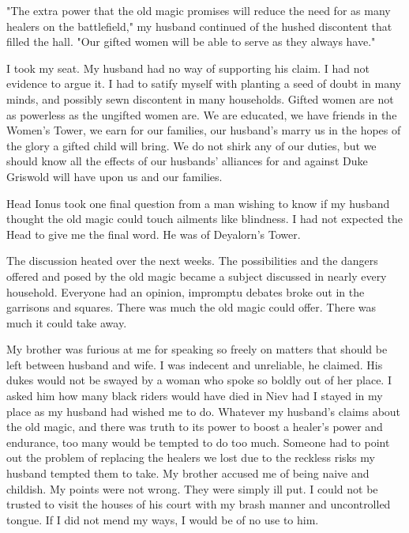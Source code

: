 \documentclass{article}
\begin{document}
"The extra power that the old magic promises will reduce the need for as many healers on the battlefield," my husband continued of the hushed discontent that filled the hall. "Our gifted women will be able to serve as they always have."

I took my seat. My husband had no way of supporting his claim. I had not evidence to argue it. I had to satify myself with planting a seed of doubt in many minds, and possibly sewn discontent in many households. Gifted women are not as powerless as the ungifted women are. We are educated, we have friends in the Women's Tower, we earn for our families, our husband's marry us in the hopes of the glory a gifted child will bring. We do not shirk any of our duties, but we should know all the effects of our husbands' alliances for and against Duke Griswold will have upon us and our families.

Head Ionus took one final question from a man wishing to know if my husband thought the old magic could touch ailments like blindness. I had not expected the Head to give me the final word. He was of Deyalorn's Tower.

\vspace{.5cm}

The discussion heated over the next weeks. The possibilities and the dangers offered and posed by the old magic became a subject discussed in nearly every household. Everyone had an opinion, impromptu debates broke out in the garrisons and squares. There was much the old magic could offer. There was much it could take away. 

My brother was furious at me for speaking so freely on matters that should be left between husband and wife. I was indecent and unreliable, he claimed. His dukes would not be swayed by a woman who spoke so boldly out of her place. I asked him how many black riders would have died in Niev had I stayed in my place as my husband had wished me to do. Whatever my husband's claims about the old magic, and there was truth to its power to boost a healer's power and endurance, too many would be tempted to do too much. Someone had to point out the problem of replacing the healers we lost due to the reckless risks my husband tempted them to take. My brother accused me of being naive and childish. My points were not wrong. They were simply ill put. I could not be trusted to visit the houses of his court with my brash manner and uncontrolled tongue. If I did not mend my ways, I would be of no use to him.
\end{document}
